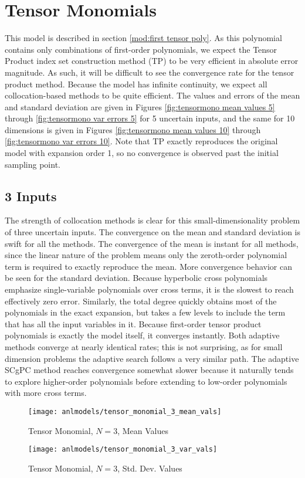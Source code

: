 \section{Tensor Monomials}
This model is described in section \ref{mod:first tensor poly}.  As this polynomial contains only combinations of
first-order polynomials, we expect the Tensor Product index set construction method (TP) to be very efficient
in absolute error magnitude.  
As such, it will be difficult to see the convergence rate for the tensor product method.
Because the model has infinite continuity, we expect all collocation-based
methods to be quite efficient.  The values and errors of the mean and standard deviation are given in Figures
\ref{fig:tensormono mean values 5} through \ref{fig:tensormono var errors 5} for 5 uncertain inputs, and the same
for 10 dimensions is given in Figures \ref{fig:tensormono mean values 10} through \ref{fig:tensormono var
errors 10}.  Note that TP exactly reproduces the original model with expansion order 1, so no convergence is
observed past the initial sampling point.

\subsection{3 Inputs}
The strength of collocation methods is clear for this small-dimensionality problem of three uncertain inputs.
The convergence on the
mean and standard deviation is swift for all the methods.  The convergence of the mean is instant for all methods, since
the linear nature of the problem means only the zeroth-order polynomial term is required to exactly reproduce the mean.
More convergence behavior can be seen for the standard deviation.
Because hyperbolic cross polynomials emphasize single-variable polynomials over cross terms, it is the slowest to reach
effectively zero error.  Similarly, the total degree quickly obtains most of the polynomials in the exact expansion,
but takes a few levels to include the term that has all the input variables in it.  Because first-order tensor product
polynomials is exactly the model itself, it converges instantly.
Both adaptive methods converge at nearly identical
rates; this is not surprising, as for small dimension problems the adaptive search follows a very similar
path.  The adaptive SCgPC method reaches convergence somewhat slower because it naturally tends to explore
higher-order polynomials before extending to low-order polynomials with more cross terms.
\begin{figure}[H]
  \centering
  \texttt{[image: anlmodels/tensor\_monomial\_3\_mean\_vals]}
  \caption{Tensor Monomial, $N=3$, Mean Values}
  \label{fig:tensormono mean values 3}
\end{figure}
\begin{figure}[H]
  \centering
  \texttt{[image: anlmodels/tensor\_monomial\_3\_var\_vals]}
  \caption{Tensor Monomial, $N=3$, Std. Dev. Values}
  \label{fig:tensormono var values 3}
\end{figure}

